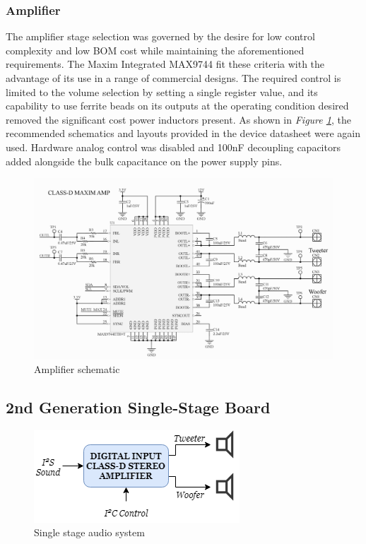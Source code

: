 \documentclass[main.tex]{subfiles}
\begin{document}
\subsubsection{Amplifier}
The amplifier stage selection was governed by the desire for low control complexity and low BOM cost while maintaining the aforementioned requirements. The Maxim Integrated MAX9744 fit these criteria with the advantage of its use in a range of commercial designs. The required control is limited to the volume selection by setting a single register value, and its capability to use ferrite beads on its outputs at the operating condition desired removed the significant cost power inductors present. As shown in \textit{Figure \ref{fig:maxim-circuit}}, the recommended schematics and layouts provided in the device datasheet were again used. Hardware analog control was disabled and 100nF decoupling capacitors added alongside the bulk capacitance on the power supply pins.

\begin{figure}[H]
    \centering
    \includegraphics[scale=0.6]{./figs/MAXIM-circuit.PNG}
    \caption{Amplifier schematic}
    \label{fig:maxim-circuit}
\end{figure}

\subsection{2nd Generation Single-Stage Board}



\begin{figure}[H]
    \centering
    \includegraphics[scale=0.75]{./figs/TAS-system.png}
    \caption{Single stage audio system}
    \label{fig:tas-system}
\end{figure}
\end{document}
